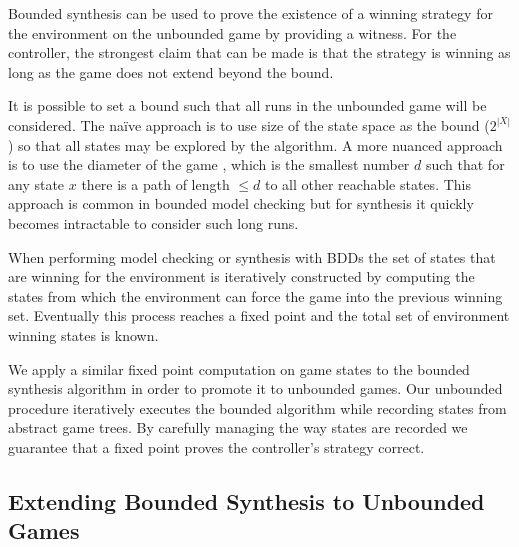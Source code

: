 \documentclass{llncs}
\begin{document}
Bounded synthesis can be used to prove the existence of a winning strategy for
the environment on the unbounded game by providing a witness. For the
controller, the strongest claim that can be made is that the strategy is
winning as long as the game does not extend beyond the bound.

It is possible to set a bound such that all runs in the unbounded game will be
considered. The na\"ive approach is to use size of the state space as the bound
($2^{|X|}$) so that all states may be explored by the algorithm. A more nuanced
approach is to use the diameter of the game \cite{biere1999}, which is the
smallest number $d$ such that for any state $x$ there is a path of length $\leq
d$ to all other reachable states. This approach is common in bounded model
checking but for synthesis it quickly becomes intractable to consider such long
runs.

When performing model checking or synthesis with BDDs \cite{burch1990} the set
of states that are winning for the environment is iteratively constructed by
computing the states from which the environment can force the game into the
previous winning set. Eventually this process reaches a fixed point and the
total set of environment winning states is known.

We apply a similar fixed point computation on game states to the bounded
synthesis algorithm in order to promote it to unbounded games. Our unbounded
procedure iteratively executes the bounded algorithm while recording states
from abstract game trees. By carefully managing the way states are recorded we
guarantee that a fixed point proves the controller's strategy correct.

\subsection{Extending Bounded Synthesis to Unbounded Games}
\end{document}

